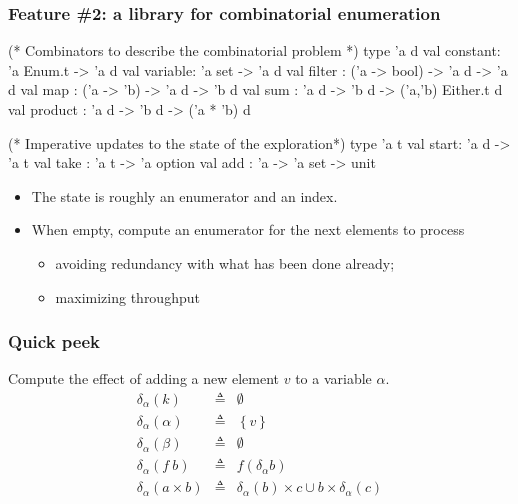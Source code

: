 \documentclass[10pt]{beamer}
\begin{document}
\begin{frame}[fragile]
  \frametitle{Feature \#2: a library for combinatorial enumeration}

\begin{ocaml}
(* Combinators to describe the combinatorial problem *)
type 'a d
val constant: 'a Enum.t -> 'a d
val variable: 'a set    -> 'a d
val filter  : ('a -> bool) -> 'a d -> 'a d
val map     : ('a -> 'b) -> 'a d -> 'b d
val sum     : 'a d -> 'b d -> ('a,'b) Either.t d
val product : 'a d -> 'b d -> ('a * 'b) d
\end{ocaml}
\pause
\begin{ocaml}
(* Imperative updates to the state of the exploration*)
type 'a t
val start: 'a d -> 'a t
val take : 'a t -> 'a option
val add  : 'a -> 'a set -> unit
\end{ocaml}

\begin{itemize}
\item The state is roughly an enumerator and an index.
\item When empty, compute an enumerator for the next elements to process
  \begin{itemize}
  \item avoiding redundancy with what has been done already;
  \item maximizing \alert{throughput}
  \end{itemize}
\end{itemize}
\end{frame}
\begin{frame}[fragile]
  \frametitle{Quick peek}

  Compute the effect of adding a new element $v$ to a variable $\alpha$.
  \begin{displaymath}
  \begin{array}{rcl}
    \delta_\alpha(k) & \triangleq & \emptyset \\
    \delta_\alpha(\alpha) & \triangleq & \left\{v\right\} \\
    \delta_\alpha(\beta)  & \triangleq & \emptyset \\
    \delta_\alpha(f~b)    & \triangleq & f (\delta_\alpha{b}) \\
    \delta_\alpha(a \times b)    & \triangleq &
    \delta_\alpha(b) \times c  \cup b \times \delta_\alpha(c) \\
  \end{array}
\end{displaymath}
\end{frame}
\end{document}
